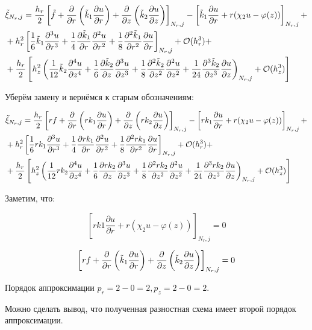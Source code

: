 \begin{align*}
  &\Tilde{\xi}_{N_r, j} = \frac{h_r}{2} \left[
    \Tilde{f} + \frac{\partial}{\partial r}\left( \Tilde{k}_1 \frac{\partial u}{\partial r}\right)
    + \frac{\partial}{\partial z}\left( \Tilde{k}_2 \frac{\partial u}{\partial z}\right)
  \right]_{N_r, j}
  - \left[
    \Tilde{k}_1\frac{\partial u}{\partial r} + r(\chi_2 u - \varphi(z))
  \right]_{N_r, j} +\\
  & +h^2_r \left[
    \frac{1}{6} \Tilde{k}_1 \frac{\partial^3 u}{\partial r^3} +
    \frac{1}{4} \frac{\partial \Tilde{k}_1}{\partial r} \frac{\partial^2 u}{\partial r^2} +
    \frac{1}{8} \frac{\partial^2 \Tilde{k}_1}{\partial r^2} \frac{\partial u}{\partial r}
  \right]_{N_r, j} + \mathcal{O}(h^3_r) +\\
  &+\frac{h_r}{2} \left[
    h^2_z \left( 
      \frac{1}{12} \Tilde{k}_2 \frac{\partial^4 u}{\partial z^4} +
      \frac{1}{6} \frac{\partial \Tilde{k}_2}{\partial z} \frac{\partial^3 u}{\partial z^3} +
      \frac{1}{8} \frac{\partial^2 \Tilde{k}_2}{\partial z^2} \frac{\partial^2 u}{\partial z^2} +
      \frac{1}{24} \frac{\partial^3 \Tilde{k}_2}{\partial z^3} \frac{\partial u}{\partial z}
    \right)_{N_r, j}
    +  \mathcal{O}(h^3_z)
  \right]
\end{align*}

Уберём замену и вернёмся к старым обозначениям:

\begin{align*}
  &\Tilde{\xi}_{N_r, j} = \frac{h_r}{2} \left[
    rf + \frac{\partial}{\partial r}\left( rk_1 \frac{\partial u}{\partial r}\right)
    + \frac{\partial}{\partial z}\left( rk_2 \frac{\partial u}{\partial z}\right)
  \right]_{N_r, j}
  - \left[
    rk_1\frac{\partial u}{\partial r} + r(\chi_2 u - \varphi(z))
  \right]_{N_r, j} +\\
  & +h^2_r \left[
    \frac{1}{6} rk_1 \frac{\partial^3 u}{\partial r^3} +
    \frac{1}{4} \frac{\partial rk_1}{\partial r} \frac{\partial^2 u}{\partial r^2} +
    \frac{1}{8} \frac{\partial^2 rk_1}{\partial r^2} \frac{\partial u}{\partial r}
  \right]_{N_r, j} + \mathcal{O}(h^3_r) +\\
  &+\frac{h_r}{2} \left[
    h^2_z \left( 
      \frac{1}{12} rk_2 \frac{\partial^4 u}{\partial z^4} +
      \frac{1}{6} \frac{\partial rk_2}{\partial z} \frac{\partial^3 u}{\partial z^3} +
      \frac{1}{8} \frac{\partial^2 rk_2}{\partial z^2} \frac{\partial^2 u}{\partial z^2} +
      \frac{1}{24} \frac{\partial^3 rk_2}{\partial z^3} \frac{\partial u}{\partial z}
    \right)_{N_r, j}
    +  \mathcal{O}(h^3_z)
  \right]
\end{align*}

Заметим, что:

\[
  \left[
    rk1\frac{\partial u}{\partial r} + r(\chi_2 u - \varphi(z))
  \right]_{N_r, j} = 0
\]

\[
  \left[rf + \frac{\partial}{\partial r}\left( \Tilde{k}_1 \frac{\partial u}{\partial r}\right)
    + \frac{\partial}{\partial z}\left( \Tilde{k}_2 \frac{\partial u}{\partial z}\right) \right]_{N_r, j} = 0
\]

Порядок аппроксимации $ p_r = 2 - 0 = 2, p_z = 2 - 0 = 2 $.

Можно сделать вывод, что полученная разностная схема имеет второй порядок аппроксимации.